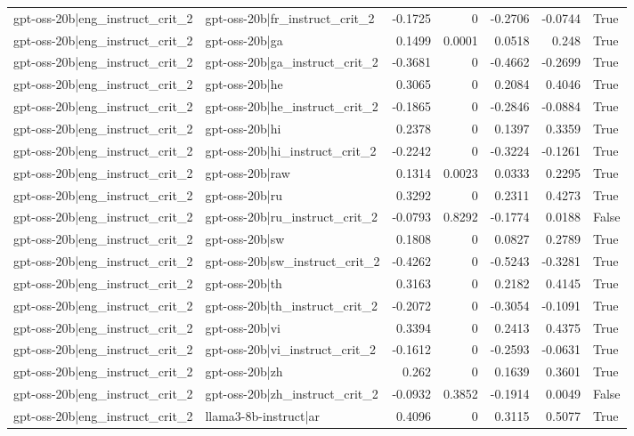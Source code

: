 \begin{table}
\begin{tabular}{l l r r r r l}
gpt-oss-20b|eng_instruct_crit_2 & gpt-oss-20b|fr_instruct_crit_2 & -0.1725 & 0 & -0.2706 & -0.0744 & True \\
gpt-oss-20b|eng_instruct_crit_2 & gpt-oss-20b|ga & 0.1499 & 0.0001 & 0.0518 & 0.248 & True \\
gpt-oss-20b|eng_instruct_crit_2 & gpt-oss-20b|ga_instruct_crit_2 & -0.3681 & 0 & -0.4662 & -0.2699 & True \\
gpt-oss-20b|eng_instruct_crit_2 & gpt-oss-20b|he & 0.3065 & 0 & 0.2084 & 0.4046 & True \\
gpt-oss-20b|eng_instruct_crit_2 & gpt-oss-20b|he_instruct_crit_2 & -0.1865 & 0 & -0.2846 & -0.0884 & True \\
gpt-oss-20b|eng_instruct_crit_2 & gpt-oss-20b|hi & 0.2378 & 0 & 0.1397 & 0.3359 & True \\
gpt-oss-20b|eng_instruct_crit_2 & gpt-oss-20b|hi_instruct_crit_2 & -0.2242 & 0 & -0.3224 & -0.1261 & True \\
gpt-oss-20b|eng_instruct_crit_2 & gpt-oss-20b|raw & 0.1314 & 0.0023 & 0.0333 & 0.2295 & True \\
gpt-oss-20b|eng_instruct_crit_2 & gpt-oss-20b|ru & 0.3292 & 0 & 0.2311 & 0.4273 & True \\
gpt-oss-20b|eng_instruct_crit_2 & gpt-oss-20b|ru_instruct_crit_2 & -0.0793 & 0.8292 & -0.1774 & 0.0188 & False \\
gpt-oss-20b|eng_instruct_crit_2 & gpt-oss-20b|sw & 0.1808 & 0 & 0.0827 & 0.2789 & True \\
gpt-oss-20b|eng_instruct_crit_2 & gpt-oss-20b|sw_instruct_crit_2 & -0.4262 & 0 & -0.5243 & -0.3281 & True \\
gpt-oss-20b|eng_instruct_crit_2 & gpt-oss-20b|th & 0.3163 & 0 & 0.2182 & 0.4145 & True \\
gpt-oss-20b|eng_instruct_crit_2 & gpt-oss-20b|th_instruct_crit_2 & -0.2072 & 0 & -0.3054 & -0.1091 & True \\
gpt-oss-20b|eng_instruct_crit_2 & gpt-oss-20b|vi & 0.3394 & 0 & 0.2413 & 0.4375 & True \\
gpt-oss-20b|eng_instruct_crit_2 & gpt-oss-20b|vi_instruct_crit_2 & -0.1612 & 0 & -0.2593 & -0.0631 & True \\
gpt-oss-20b|eng_instruct_crit_2 & gpt-oss-20b|zh & 0.262 & 0 & 0.1639 & 0.3601 & True \\
gpt-oss-20b|eng_instruct_crit_2 & gpt-oss-20b|zh_instruct_crit_2 & -0.0932 & 0.3852 & -0.1914 & 0.0049 & False \\
gpt-oss-20b|eng_instruct_crit_2 & llama3-8b-instruct|ar & 0.4096 & 0 & 0.3115 & 0.5077 & True \\

\end{tabular}
\end{table}

